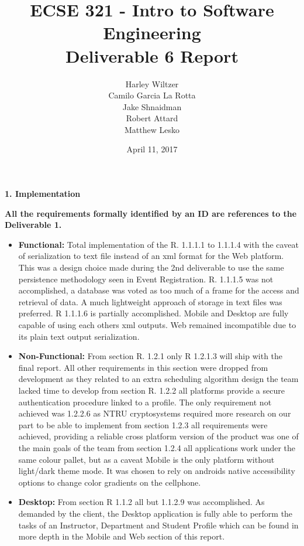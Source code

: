 \documentclass[12pt]{article}
\title{ECSE 321 - Intro to Software Engineering\\Deliverable 6 Report}
\author{Harley Wiltzer\\Camilo Garcia La Rotta\\Jake Shnaidman\\Robert Attard\\Matthew Lesko}
\date{April 11, 2017}
\begin{document}
\maketitle
\newpage
{} %

\newpage
\textbf{1. Implementation}


\textbf{All the requirements formally identified by an ID are references to the Deliverable 1.}
\begin{itemize}

    \item \textbf{Functional:} Total implementation of the R. 1.1.1.1 to 1.1.1.4 with the caveat of serialization to text file instead of an xml format for the Web platform. This was a design choice made during the 2nd deliverable to use the same persistence methodology seen in Event Registration. R. 1.1.1.5 was not accomplished, a database was voted as too much of a frame for the access and retrieval of data. A much lightweight approach of storage in text files was preferred. R 1.1.1.6 is partially accomplished. Mobile and Desktop are fully capable of using each others xml outputs. Web remained incompatible due to its plain text output serialization.
        
    \item \textbf{Non-Functional:} From section R. 1.2.1 only R 1.2.1.3 will ship with the final report. All other requirements in this section were dropped from development as they related to an extra scheduling algorithm design the team lacked time to develop
    from section R. 1.2.2 all platforms provide a secure authentication procedure linked to a profile. The only requirement not achieved was 1.2.2.6 as NTRU cryptosystems required more research on our part to be able to implement from section 1.2.3 all requirements were achieved, providing a reliable cross platform version of the product was one of the main goals of the team from section 1.2.4 all applications work under the same colour pallet, but as a caveat Mobile is the only platform without light/dark theme mode. It was chosen to rely on androids native accessibility options to change color gradients on the cellphone.
        

	\item \textbf{Desktop:} From section R 1.1.2 all but 1.1.2.9 was accomplished. As demanded by the client, the Desktop application is fully able to perform the tasks of an Instructor, Department and Student Profile which can be found in more depth in the Mobile and Web section of this report.
	

\end{itemize}
\end{document}
